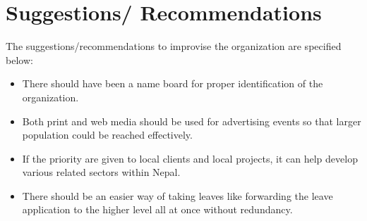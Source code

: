 \section{Suggestions/ Recommendations}
The suggestions/recommendations to improvise the organization are specified below:
\begin{itemize}
\item  There should have been a name board for proper identification of the organization.
\item
Both print and web media should be used for advertising events so that larger population could be
reached effectively.
\item If the priority are given to local clients and local projects, it can help develop various related sectors
within Nepal.
\item  There should be an easier way of taking leaves like forwarding the leave application to the higher level
all at once without redundancy.
\end{itemize}
\cleardoublepage
